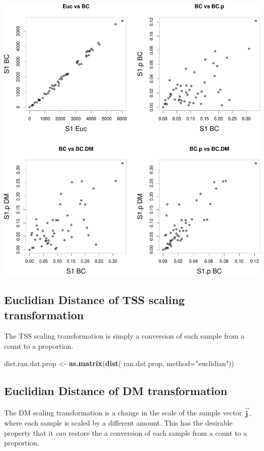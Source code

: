 \documentclass[twocolumn]{article}
\newenvironment{Shaded}{\begin{snugshade}}{\end{snugshade}}
\newcommand{\KeywordTok}[1]{\textcolor[rgb]{0.13,0.29,0.53}{\textbf{{#1}}}}
\newcommand{\DataTypeTok}[1]{\textcolor[rgb]{0.13,0.29,0.53}{{#1}}}
\newcommand{\StringTok}[1]{\textcolor[rgb]{0.31,0.60,0.02}{{#1}}}
\newcommand{\NormalTok}[1]{{#1}}
\newcommand{\vect}[1]{\vec{\textbf{#1}}}
\begin{document}
\includegraphics{main_files/figure-latex/R_block_bray-1.pdf}

\subsection{Euclidian Distance of TSS scaling transformation}

The TSS scaling transformation is simply a conversion of each sample
from a count to a proportion.

\begin{Shaded}
\begin{Highlighting}[]
\NormalTok{dist.ran.dat.prop <-}\StringTok{ }\KeywordTok{as.matrix}\NormalTok{(}\KeywordTok{dist}\NormalTok{(}
    \NormalTok{ran.dat.prop, }\DataTypeTok{method=}\StringTok{"euclidian"}\NormalTok{))}
\end{Highlighting}
\end{Shaded}

\subsection{Euclidian Distance of DM transformation}

The DM scaling transformation is a change in the scale of the sample
vector \(\vect{j}\), where each sample is scaled by a different amount.
This has the desirable property that it \emph{can} restore the a
conversion of each sample from a count to a proportion.
\end{document}
